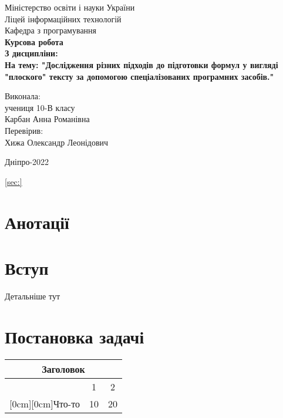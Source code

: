 \documentclass[a4paper]{article}
\begin{document}
\thispagestyle{empty}
\begin{center}
\hfill \break
\normalsize{Міністерство освіти і науки України}\\
\normalsize{Ліцей інформаційних технологій}\\
\normalsize{Кафедра з програмування}\\
\hfill\break
\hfill \break
\hfill \break
\hfill \break
\large{\textbf{Курсова робота}}\\
\normalsize{\textbf{З дисципліни:}}\\
\textbf{На тему: "Дослідження різних підходів до підготовки формул у вигляді "плоского" тексту за допомогою спеціалізованих програмних засобів."}\\
\end{center}


\begin{flushright}
\normalsize{Виконала:}\\
\normalsize{учениця 10-В класу}\\
\normalsize{Карбан Анна Романівна}\\
\normalsize{Перевірив:}\\
\normalsize{Хижа Олександр Леонідович}\\
\end{flushright}


\begin{center}
  Дніпро-2022 \pagebreak
\end{center}

\newpage
\begin{center}
   \tableofcontents %
   \label{sec:}
   \ref{sec:}
\end{center}

\newpage
\section{Анотації}
\newpage
\section{Вступ}
Детальніше тут\cite{LateX_Baldin}
\newpage
\section{Постановка задачі}
\begin{center}
\begin{tabular}{|c|c|c|}
\hline
\multicolumn{3}{|c|}{\textbf{Заголовок}} \\
\hline
& 1 & 2 \\
\cline{2-3}
\raisebox{1.5ex}[0cm][0cm]{Что-то}
& 10 & 20 \\
\hline
\end{tabular}
\end{center}
\end{document}
